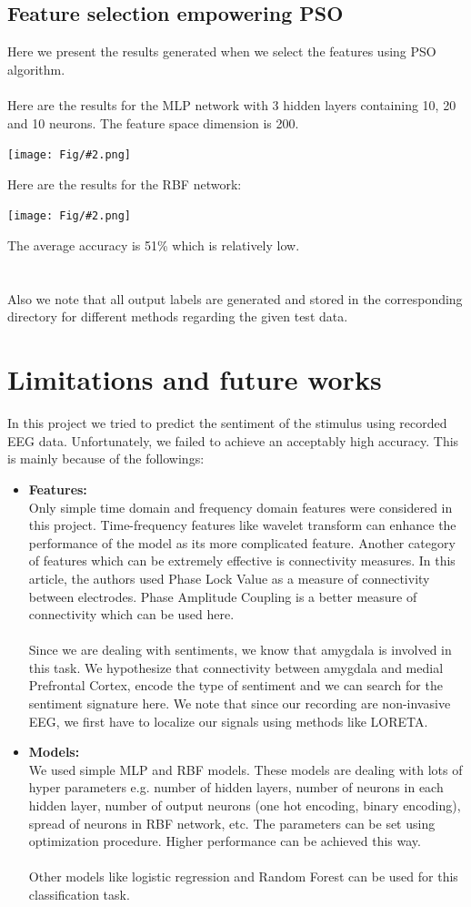 \documentclass[]{article}
\newcommand{\pict}[2]{\begin{center}
		\texttt{[image: Fig/\#2.png]}
\end{center}}
\begin{document}
	\subsection{Feature selection empowering PSO}
	Here we present the results generated when we select the features using PSO algorithm.\\\\
	Here are the results for the MLP network with 3 hidden layers containing 10, 20 and 10 neurons. The feature space dimension is 200.
	\pict{0.6}{F11}
	Here are the results for the RBF network:
	\pict{0.6}{F10}
	The average accuracy is 51\% which is relatively low.\\\\\\
	Also we note that all output labels are generated and stored in the corresponding directory for different methods regarding the given test data.
	
	\section{Limitations and future works}
	In this project we tried to predict the sentiment of the stimulus using recorded EEG data. Unfortunately, we failed to achieve an acceptably high accuracy. This is mainly because of the followings:
	\begin{itemize}
		\item \textbf{Features:}\\
		Only simple time domain and frequency domain features were considered in this project. Time-frequency features like wavelet transform can enhance the performance of the model as its more complicated feature. Another category of features which can be extremely effective is connectivity measures. In this article, the authors used Phase Lock Value as a measure of connectivity between electrodes. Phase Amplitude Coupling is a better measure of connectivity which can be used here.\\\\
		Since we are dealing with sentiments, we know that amygdala is involved in this task. We hypothesize that connectivity between amygdala and medial Prefrontal Cortex, encode the type of sentiment and we can search for the sentiment signature here. We note that since our recording are non-invasive EEG, we first have to localize our signals using methods like LORETA.
		
		\item \textbf{Models:}\\
		We used simple MLP and RBF models. These models are dealing with lots of hyper parameters e.g. number of hidden layers, number of neurons in each hidden layer, number of output neurons (one hot encoding, binary encoding), spread of neurons in RBF network, etc. The parameters can be set using optimization procedure. Higher performance can be achieved this way.\\\\
		Other models like logistic regression and Random Forest can be used for this classification task.
	\end{itemize}
	
\end{document}
